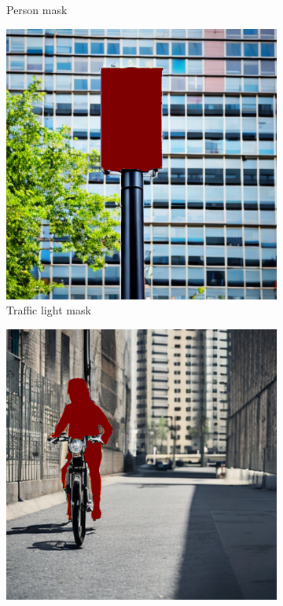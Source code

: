 \begin{figure}
\begin{subfigure}{0.24\columnwidth}
   \caption{Person mask}
   \label{subfig:dataset-example-person-mask}
  \end{subfigure}
  \begin{subfigure}{0.24\columnwidth}
   \includegraphics[width=\columnwidth]{img/4-experiments/example_mask_traffic light.png}
   \caption{Traffic light mask}
   \label{subfig:dataset-example-traffic-mask}
  \end{subfigure}
    \begin{subfigure}{0.24\columnwidth}
   \includegraphics[width=\columnwidth]{img/4-experiments/example_mask_rider.png}

\end{subfigure}
\end{figure}
